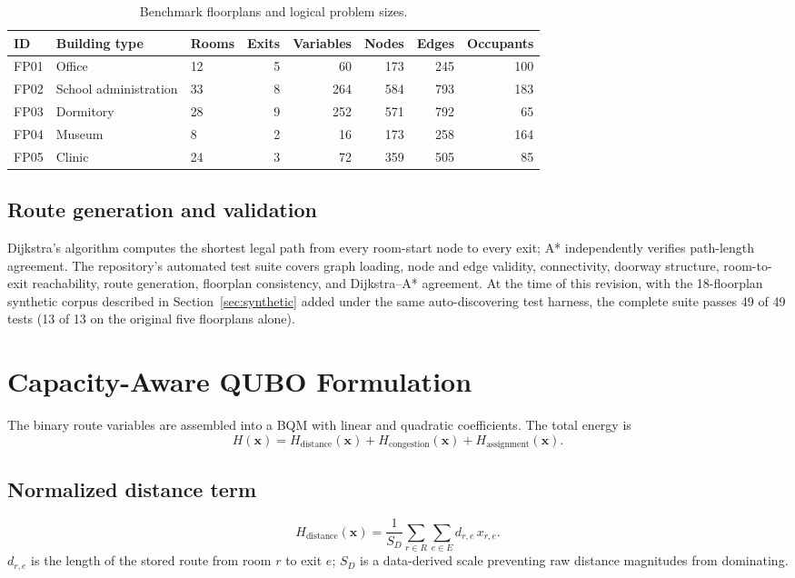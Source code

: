 \documentclass[11pt]{article}
\begin{document}
\begin{table}[h]
\centering
\caption{Benchmark floorplans and logical problem sizes.}
\label{tab:floorplans}
\small
\begin{tabular}{lllrrrrr}
\toprule
ID & Building type & Rooms & Exits & Variables & Nodes & Edges & Occupants \\
\midrule
FP01 & Office & 12 & 5 & 60 & 173 & 245 & 100 \\
FP02 & School administration & 33 & 8 & 264 & 584 & 793 & 183 \\
FP03 & Dormitory & 28 & 9 & 252 & 571 & 792 & 65 \\
FP04 & Museum & 8 & 2 & 16 & 173 & 258 & 164 \\
FP05 & Clinic & 24 & 3 & 72 & 359 & 505 & 85 \\
\bottomrule
\end{tabular}
\end{table}

\subsection{Route generation and validation}
Dijkstra's algorithm computes the shortest legal path from every room-start node to every exit; A* independently verifies path-length agreement. The repository's automated test suite covers graph loading, node and edge validity, connectivity, doorway structure, room-to-exit reachability, route generation, floorplan consistency, and Dijkstra--A* agreement. At the time of this revision, with the 18-floorplan synthetic corpus described in Section~\ref{sec:synthetic} added under the same auto-discovering test harness, the complete suite passes 49 of 49 tests (13 of 13 on the original five floorplans alone).

\section{Capacity-Aware QUBO Formulation}

The binary route variables are assembled into a BQM with linear and quadratic coefficients. The total energy is
\begin{equation}
H(\mathbf{x}) = H_{\text{distance}}(\mathbf{x}) + H_{\text{congestion}}(\mathbf{x}) + H_{\text{assignment}}(\mathbf{x}). \tag{2}
\end{equation}

\subsection{Normalized distance term}
\begin{equation}
H_{\text{distance}}(\mathbf{x}) = \frac{1}{S_D}\sum_{r \in R}\sum_{e \in E} d_{r,e}\, x_{r,e}. \tag{3}
\end{equation}
$d_{r,e}$ is the length of the stored route from room $r$ to exit $e$; $S_D$ is a data-derived scale preventing raw distance magnitudes from dominating.
\end{document}
